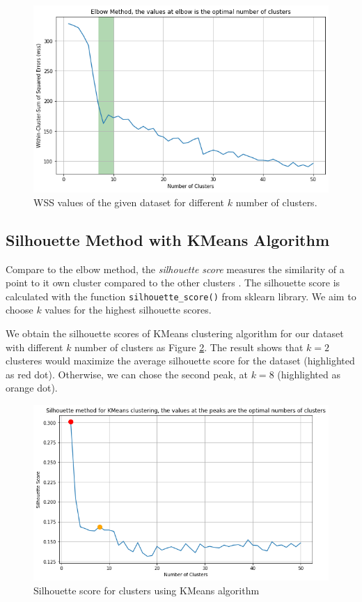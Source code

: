 \begin{figure}
    \includegraphics[width=\textwidth]{Appendices/elbow.png}
    \caption{WSS values of the given dataset for different $k$ number of clusters.}
    \label{Fig: WSS}
\end{figure}

\subsection{Silhouette Method with KMeans Algorithm}
Compare to the elbow method, the \emph{silhouette score} measures the similarity of a point to it own cluster compared to the other clusters \cite{shahapure2020cluster}.
The silhouette score is calculated with the function \lstinline{silhouette_score()} from sklearn library.
We aim to choose $k$ values for the highest silhouette scores.

We obtain the silhouette scores of KMeans clustering algorithm for our dataset with different $k$ number of clusters as Figure \ref{Fig: Sil Kmeans}.
The result shows that $k=2$ clusteres would maximize the average silhouette score for the dataset (highlighted as red dot).
Otherwise, we can chose the second peak, at $k = 8$ (highlighted as orange dot).

\begin{figure}
    \includegraphics[width=\textwidth]{Appendices/Sil-Kmean.png}
    \caption{Silhouette score for clusters using KMeans algorithm}
    \label{Fig: Sil Kmeans}
\end{figure}

